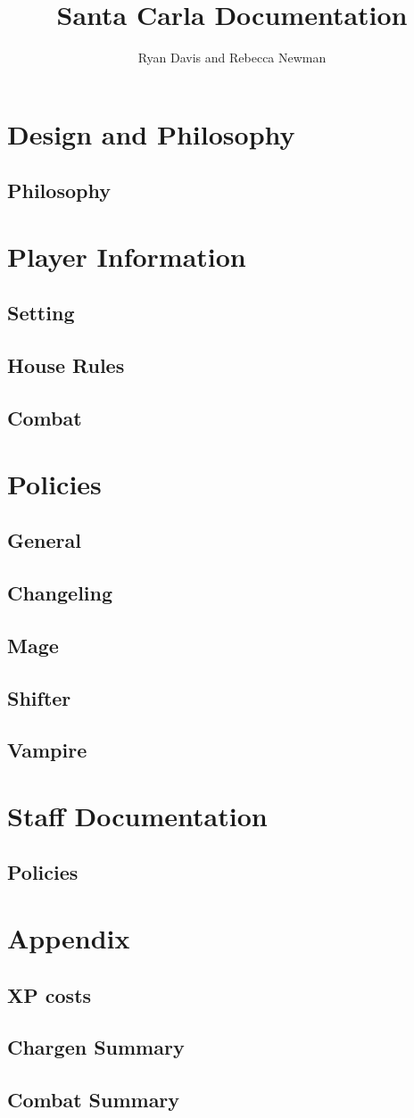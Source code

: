 \documentclass[letterpaper,twocolumn]{book}
\title{Santa Carla Documentation}
\author{Ryan Davis and Rebecca Newman}
\begin{document}
\pagestyle{empty}
\maketitle
\frontmatter
\pagestyle{headings}
\tableofcontents
\mainmatter
\part{Design and Philosophy}
\chapter{Philosophy}

\part{Player Information}
\chapter{Setting}

\chapter{House Rules}
\chapter{Combat}
\part{Policies}
\chapter{General}

\chapter{Changeling}
\chapter{Mage}
\chapter{Shifter}
\chapter{Vampire}
\part{Staff Documentation}
\chapter{Policies}

\backmatter
\part{Appendix}
\chapter{XP costs}
\chapter{Chargen Summary}
\chapter{Combat Summary}
\end{document}
